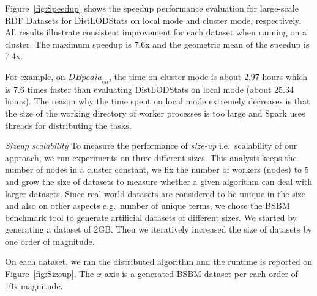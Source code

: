 Figure~\ref{fig:Speedup} shows the speedup performance evaluation for large-scale \gls{RDF} Datasets for DistLODStats on local mode and cluster mode, respectively.
All results illustrate consistent improvement for each dataset when running on a cluster. 
The maximum speedup is 7.6x and the geometric mean of the speedup is 7.4x.

For example, on ${DBpedia}_{en}$, the time on cluster mode is about 2.97 hours which is 7.6 times faster than evaluating DistLODStats on local mode (about 25.34 hours). 
The reason why the time spent on local mode extremely decreases is that the size of the working directory of worker processes is too large and Spark uses threads for distributing the tasks.

\textit{Sizeup scalability} 
To measure the performance of \textit{size-up} i.e.~scalability of our approach, we run experiments on three different sizes.
This analysis keeps the number of nodes in a cluster constant, we fix the number of workers (nodes) to 5 and grow the size of datasets to measure whether a given algorithm can deal with larger datasets.
Since real-world datasets are considered to be unique in the size and also on other aspects e.g.~number of unique terms, we chose the BSBM benchmark tool to generate artificial datasets of different sizes.
We started by generating a dataset of 2GB.
Then we iteratively increased the size of datasets by one order of magnitude.

On each dataset, we ran the distributed algorithm and the runtime is reported on Figure~\ref{fig:Sizeup}.
The $x$-axis is a generated BSBM dataset per each order of 10x magnitude.

